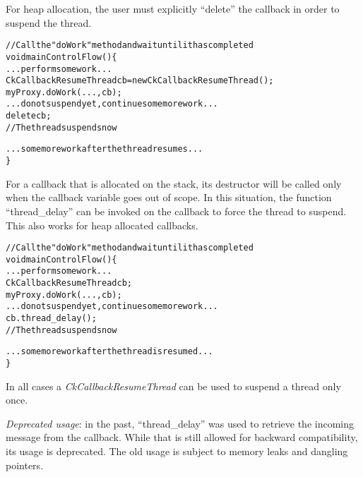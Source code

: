 For heap allocation, the user must explicitly ``delete'' the callback in order to
suspend the thread.

\begin{alltt}
// Call the "doWork" method and wait until it has completed
void mainControlFlow() \{
  ...perform some work...
  CkCallbackResumeThread cb = new CkCallbackResumeThread();
  myProxy.doWork(...,cb);
  ...do not suspend yet, continue some more work...
  delete cb;
  // The thread suspends now

  ...some more work after the thread resumes...
\}
\end{alltt}

For a callback that is allocated on the stack, its destructor will be called only
when the callback variable goes out of scope. In this
situation, the function ``thread\_delay'' can be invoked on the callback to
force the thread to suspend. This also works for heap allocated callbacks.

\begin{alltt}
// Call the "doWork" method and wait until it has completed
void mainControlFlow() \{
  ...perform some work...
  CkCallbackResumeThread cb;
  myProxy.doWork(...,cb);
  ...do not suspend yet, continue some more work...
  cb.thread\_delay();
  // The thread suspends now

  ...some more work after the thread is resumed...
\}
\end{alltt}

In all cases a {\em CkCallbackResumeThread} can be used to suspend a thread
only once.

{\em Deprecated usage}: in the past, ``thread\_delay'' was used to retrieve the
incoming message from the callback. While that is still allowed for backward
compatibility, its usage is deprecated. The old usage is subject to memory
leaks and dangling pointers.

